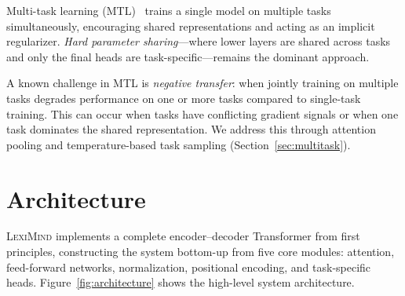 \documentclass[11pt,a4paper]{article}
\newcommand{\lexiname}{\textsc{LexiMind}}
\begin{document}
Multi-task learning (MTL)~\citep{caruana1997multitask} trains a single model on multiple tasks simultaneously, encouraging shared representations and acting as an implicit regularizer.
\emph{Hard parameter sharing}---where lower layers are shared across tasks and only the final heads are task-specific---remains the dominant approach.

A known challenge in MTL is \emph{negative transfer}: when jointly training on multiple tasks degrades performance on one or more tasks compared to single-task training.
This can occur when tasks have conflicting gradient signals or when one task dominates the shared representation.
We address this through attention pooling and temperature-based task sampling (Section~\ref{sec:multitask}).

\section{Architecture}
\label{sec:architecture}

\lexiname{} implements a complete encoder--decoder Transformer from first principles, constructing the system bottom-up from five core modules: attention, feed-forward networks, normalization, positional encoding, and task-specific heads.
Figure~\ref{fig:architecture} shows the high-level system architecture.
\end{document}
